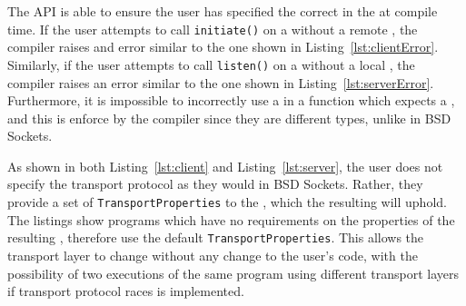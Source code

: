 The API is able to ensure the user has specified the correct \Endpoint{} in the \preconnection{} at compile time.
If the user attempts to call \texttt{initiate()} on a \preconnection{} without a remote \Endpoint{}, the compiler raises
and error similar to the one shown in Listing~\ref{lst:clientError}.
Similarly, if the user attempts to call \texttt{listen()} on a \preconnection{} without a local \Endpoint{}, the
compiler raises an error similar to the one shown in Listing~\ref{lst:serverError}.
Furthermore, it is impossible to incorrectly use a \listener{} in a function which expects a \connection{}, and this is
enforce by the compiler since they are different types, unlike in BSD Sockets.




As shown in both Listing~\ref{lst:client} and Listing~\ref{lst:server}, the user does not specify the transport protocol
as they would in BSD Sockets.
Rather, they provide a set of \texttt{TransportProperties} to the \preconnection{}, which the resulting \connection{}
will uphold.
The listings show programs which have no requirements on the properties of the resulting \connection{}, therefore
use the default \texttt{TransportProperties}.
This allows the transport layer to change without any change to the user's code, with the possibility of two executions
of the same program using different transport layers if transport protocol races is implemented.

